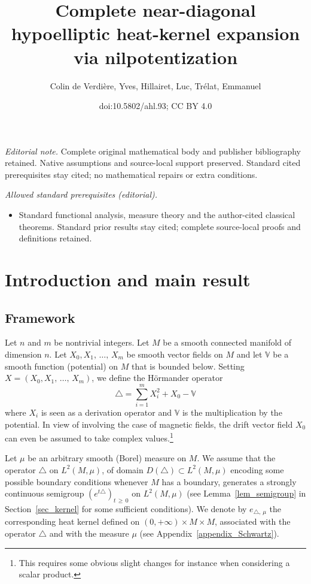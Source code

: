 \documentclass[10pt]{amsart}
\title{Complete near-diagonal hypoelliptic heat-kernel expansion via nilpotentization}
\author{Colin de Verdière, Yves, Hillairet, Luc, Trélat, Emmanuel}
\date{doi:10.5802/ahl.93; CC BY 4.0}
\theoremstyle{definition}\newtheorem{defi}[theo]{Definition}\newtheorem{rema}[theo]{Remark}\newtheorem{exam}[theo]{Example}\newtheorem{exem}[theo]{Example}\newtheorem{nota}[theo]{Notation}
\newcommand{\bbV}{\mathbb{V}}
\renewcommand{\geq}{\geqslant}
\begin{document}
\maketitle
\noindent\textit{Editorial note.} Complete original mathematical body and publisher bibliography retained. Native assumptions and source-local support preserved. Standard cited prerequisites stay cited; no mathematical repairs or extra conditions.\par\medskip
\noindent\textit{Allowed standard prerequisites (editorial).}\begin{itemize}
\item Standard functional analysis, measure theory and the author-cited classical theorems. Standard prior results stay cited; complete source-local proofs and definitions retained.
\end{itemize}\medskip

\tableofcontents
\newpage



\section{Introduction and main result}
\subsection{Framework}\label{sec_intro}
Let $n$ and $m$ be nontrivial integers. Let $M$ be a smooth connected manifold of dimension $n$. Let $X_0,X_1,\,\ldots,\,X_m$ be smooth vector fields on $M$ and let $\bbV$ be a smooth function (potential) on $M$ that is bounded below. Setting $X=(X_0,X_1,\,\ldots,\,X_m)$, we define the H\"ormander operator
\begin{equation}\label{def_DeltaX}
\triangle = \sum_{i=1}^m X_i^2 + X_0 - \bbV
\end{equation}
where $X_i$ is seen as a derivation operator and $\bbV$ is the multiplication by the potential. In view of involving the case of magnetic fields, the drift vector field $X_0$ can even be assumed to take complex values.\footnote{This requires some obvious slight changes for instance when considering a scalar product.}

Let $\mu$ be an arbitrary smooth (Borel) measure on $M$. We assume that the operator $\triangle$ on $L^2(M,\mu)$, of domain $D(\triangle)\subset L^2(M,\mu)$ encoding some possible boundary conditions whenever $M$ has a boundary, generates a strongly continuous semigroup $(e^{t\triangle})_{t\,\geq\,0}$ on $L^2(M,\mu)$ (see Lemma~\ref{lem_semigroup} in Section~\ref{sec_kernel} for some sufficient conditions). We denote by $e_{\triangle,\,\mu}$ the corresponding heat kernel defined on $(0,+\infty)\times M\times M$, associated with the operator $\triangle$ and with the measure $\mu$ (see Appendix~\ref{appendix_Schwartz}).
\end{document}
